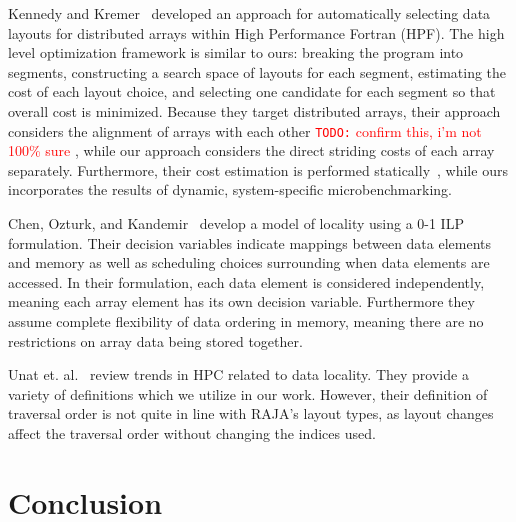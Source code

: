 \documentclass[sigconf, table]{acmart}
\newcommand{\todo}[1]{{\textcolor{red}{{\tt{TODO:}}\,\,#1 }}}
\begin{document}
Kennedy and Kremer~\cite{kennedy1995automatic} developed an approach for automatically selecting data layouts for distributed arrays within High Performance Fortran (HPF). 
The high level optimization framework is similar to ours: breaking the program into segments, constructing a search space of layouts for each segment, estimating the cost of each layout choice, and selecting one candidate for each segment so that overall cost is minimized. 
Because they target distributed arrays, their approach considers the alignment of arrays with each other \todo{confirm this, i'm not 100\% sure}, while our approach considers the direct striding costs of each array separately. 
Furthermore, their cost estimation is performed statically~\cite{bixby1994automatic}, while ours incorporates the results of dynamic, system-specific microbenchmarking.


Chen, Ozturk, and Kandemir~\cite{Chen2004ilp} develop a model of locality using a 0-1 ILP formulation. 
Their decision variables indicate mappings between data elements and memory as well as scheduling choices surrounding when data elements are accessed. 
In their formulation, each data element is considered independently, meaning each array element has its own decision variable. 
Furthermore they assume complete flexibility of data ordering in memory, meaning there are no restrictions on array data being stored together.

Unat et. al.~\cite{unat2017trends} review trends in HPC related to data locality. They provide a variety of definitions which we utilize in our work. However, their definition of traversal order is not quite in line with RAJA's layout types, as layout changes affect the traversal order without changing the indices used. 
\section{Conclusion}




\end{document}
